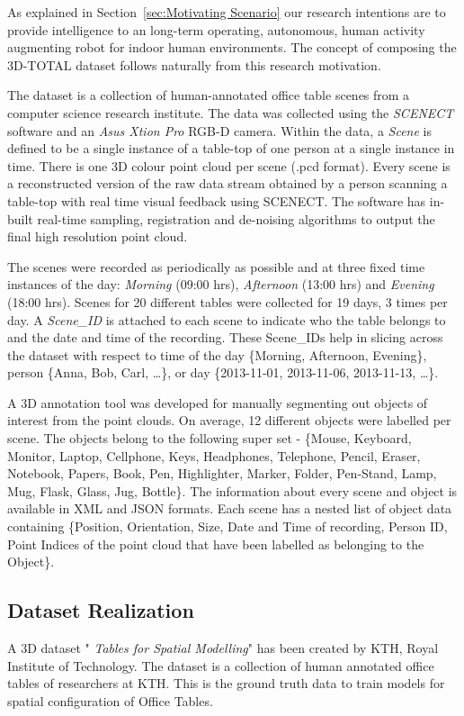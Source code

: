 \documentclass[letterpaper, 10 pt, conference]{ieeeconf}  %
\begin{document}
As explained in Section~\ref{sec:Motivating Scenario} our research intentions are to provide intelligence to an long-term operating, autonomous, human activity augmenting robot for indoor human environments. The concept of composing the 3D-TOTAL dataset follows naturally from this research motivation.

The dataset is a collection of human-annotated office table scenes from a computer science research institute. The data was collected using the \textit{SCENECT} software \cite{Buerkler:Online2012} and an \textit{Asus Xtion Pro} RGB-D camera. Within the data, a \textit{Scene} is defined to be a single instance of a table-top of one person at a single instance in time. There is one 3D colour point cloud per scene (.pcd format). Every scene is a reconstructed version of the raw data stream obtained by a person scanning a table-top with real time visual feedback using SCENECT. The software has in-built real-time sampling, registration and de-noising algorithms to output the final high resolution point cloud.

The scenes were recorded as periodically as possible and at three fixed time instances of the day: \emph{Morning} (09:00 hrs), \emph{Afternoon} (13:00 hrs) and \emph{Evening} (18:00 hrs). Scenes for 20 different tables were collected for 19 days, 3 times per day. A \textit{Scene\_ID} is attached to each scene to indicate who the table belongs to and the date and time of the recording. These Scene\_IDs help in slicing across the dataset with respect to time of the day \{Morning, Afternoon, Evening\}, person \{Anna, Bob, Carl, \dots\}, or day \{2013-11-01, 2013-11-06, 2013-11-13, \dots\}.

A 3D annotation tool was developed for manually segmenting out objects of interest from the point clouds. On average, 12 different objects were labelled per scene. The objects belong to the following super set - \{Mouse, Keyboard, Monitor, Laptop, Cellphone, Keys, Headphones, Telephone, Pencil, Eraser, Notebook, Papers,  Book, Pen, Highlighter, Marker, Folder, Pen-Stand, Lamp, Mug, Flask, Glass, Jug, Bottle\}. The information about every scene and object is available in  XML and JSON formats. Each scene has a nested list of object data containing \{Position, Orientation, Size, Date and Time of recording, Person ID, Point Indices of the point cloud that have been labelled as belonging to the Object\}.

\subsection{Dataset Realization}
A 3D dataset " \textit{Tables for Spatial Modelling}" has been created by KTH, Royal Institute of Technology. The dataset is a collection of human annotated office tables of researchers at KTH. This is the ground truth data to train models for spatial configuration of Office Tables.
\end{document}
